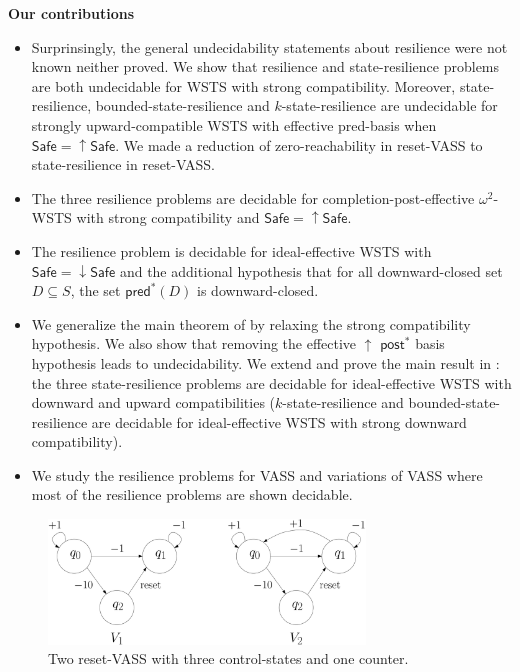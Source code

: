 \documentclass[runningheads]{llncs}
\newcommand{\pred}{\textsf{pred}}
\newcommand{\post}{\textsf{post}}
\newcommand{\Safe}{\textsf{Safe}}
\begin{document}
\noindent
{\bf Our contributions}
\begin{itemize}
\item Surprinsingly, the general undecidability statements about resilience were not known neither proved. We show that resilience and {state-resilience} problems are both undecidable for WSTS with strong compatibility. 
Moreover, {state-resilience},
{bounded-state-resilience} and
{$k$-state-resilience}
are undecidable for strongly upward-compatible WSTS with effective pred-basis
when
$\Safe=\uparrow \Safe$. We made a reduction of zero-reachability in reset-VASS to {state-resilience} in reset-VASS.


\item The three resilience problems are decidable for completion-post-effective $\omega^2$-WSTS with strong compatibility and $\Safe = \uparrow \Safe$.


\item The resilience problem is decidable for ideal-effective WSTS with 
$\Safe=\downarrow \Safe$
and
the additional hypothesis that
for all downward-closed set $D \subseteq S$, the set $\pred^*(D)$ is downward-closed.
%

\item We generalize the main theorem of \cite{DBLP:journals/corr/abs-2108-00889,DBLP:conf/gg/Ozkan22} by relaxing the strong compatibility hypothesis.
We also show that removing the effective 
$\uparrow$ $\post^*$ basis hypothesis leads to undecidability. We extend and prove the main result in  \cite{DBLP:journals/corr/PrasadZ16} : the three state-resilience problems are decidable for ideal-effective WSTS with downward and upward compatibilities ({$k$-state-resilience} and {bounded-state-resilience} are decidable for ideal-effective WSTS with strong downward compatibility).
%

\item We study the resilience problems for VASS and variations of VASS where most of the resilience problems are shown decidable.
\end{itemize}


 \begin{center}
	\begin{figure}
			\hspace{0.8cm}
\includegraphics[width=0.75\textwidth]{FigureCD}
	\caption{Two reset-VASS with three control-states and one counter.}
					\label{r-V}
	\end{figure}
\end{center}
\end{document}
